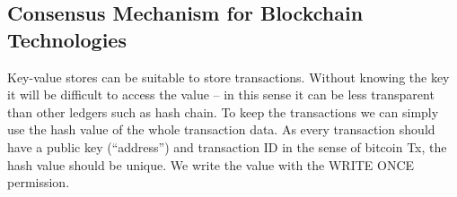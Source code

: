 \subsection{Consensus Mechanism for Blockchain Technologies}
Key-value stores can be suitable to store transactions. Without
knowing the key it will be difficult to access the value -- in this
sense it can be less transparent than other ledgers such as hash
chain. To keep the transactions we can simply use the hash value of
the whole transaction data. As every transaction should have a public
key (``address'') and transaction ID in the sense of bitcoin
Tx, the hash value should be unique. We write the value with
the WRITE ONCE permission.
